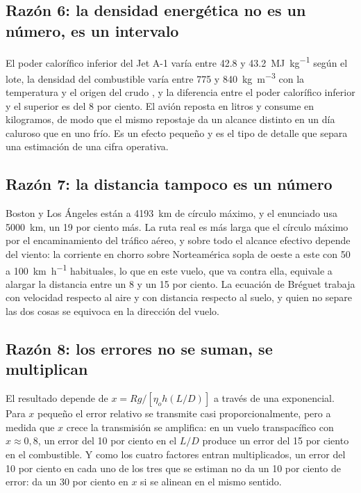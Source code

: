 \documentclass[11pt,letterpaper]{article}
\begin{document}
\subsection{Razón 6: la densidad energética no es un número, es un intervalo}

El poder calorífico inferior del Jet A-1 varía entre \num{42.8} y
\SI{43.2}{\mega\joule\per\kilogram} según el lote, la densidad del combustible
varía entre \num{775} y \SI{840}{\kilogram\per\meter\cubed} con la temperatura
y el origen del crudo \parencite{chevron2007}, y la diferencia entre el poder
calorífico inferior y el superior es del 8 por ciento. El avión reposta en
litros y consume en kilogramos, de modo que el mismo repostaje da un alcance
distinto en un día caluroso que en uno frío. Es un efecto pequeño y es el tipo
de detalle que separa una estimación de una cifra operativa.

\subsection{Razón 7: la distancia tampoco es un número}

Boston y Los Ángeles están a \SI{4193}{\kilo\meter} de círculo máximo, y el
enunciado usa \SI{5000}{\kilo\meter}, un 19 por ciento más. La ruta real es más
larga que el círculo máximo por el encaminamiento del tráfico aéreo, y sobre
todo el alcance efectivo depende del viento: la corriente en chorro sobre
Norteamérica sopla de oeste a este con \num{50} a
\SI{100}{\kilo\meter\per\hour} habituales, lo que en este vuelo, que va contra
ella, equivale a alargar la distancia entre un 8 y un 15 por ciento. La
ecuación de Bréguet trabaja con velocidad respecto al aire y con distancia
respecto al suelo, y quien no separe las dos cosas se equivoca en la dirección
del vuelo.

\subsection{Razón 8: los errores no se suman, se multiplican}

El resultado depende de \(x = Rg/[\eta_o h (L/D)]\) a través de una
exponencial. Para \(x\) pequeño el error relativo se transmite casi
proporcionalmente, pero a medida que \(x\) crece la transmisión se amplifica:
en un vuelo transpacífico con \(x \approx 0{,}8\), un error del 10 por ciento en
el \(L/D\) produce un error del 15 por ciento en el combustible. Y como los
cuatro factores entran multiplicados, un error del 10 por ciento en cada uno de
los tres que se estiman no da un 10 por ciento de error: da un 30 por ciento en
\(x\) si se alinean en el mismo sentido.
\end{document}
